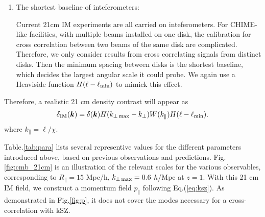 \begin{enumerate}
\item The shortest baseline of inteferometers:

Current 21cm IM experiments are all carried on inteferometers. 
For CHIME-like facilities, with multiple beams installed on one disk, 
the calibration for cross correlation between two beams of the same disk 
are complicated. 
Therefore, we only consider results from cross correlating signals from distinct disks. 
Then the minimum spacing between disks is the shortest baseline, which decides the largest angular scale it could probe.  We again use a Heaviside function 
$H(\ell-\ell_\mathrm{min})$ to mimick this effect. 
\end{enumerate}
Therefore, a realistic 21 cm density contrast will appear as 
\begin{eqnarray}
\label{eq:ns}
    \delta_\mathrm{IM}(\bm{k})=\delta(\bm{k})H(k_{\perp\,\mathrm{max}}-k_\perp)W(k_\parallel)H(\ell-\ell_\mathrm{min}).
\end{eqnarray}
where $k_\parallel = \ell / \chi$. 

Table.\ref{tab:para} lists several representive values for the different parameters introduced above, based on previous observations and predictions. Fig. \ref{fig:cmb_21cm} is an illustration of the relevant scales for the various observables, corresponding to $R_\parallel=15$ Mpc/h, $k_{\perp\,\mathrm{max}}=0.6$ $h$/Mpc at $z=1$. With this 21 cm IM field, we construct a momentum field $p_\parallel$ following Eq.(\ref{eq:ksz}). As demonstrated in Fig.\ref{fig:p}, it does not cover the modes necessary for a cross-correlation with kSZ.


